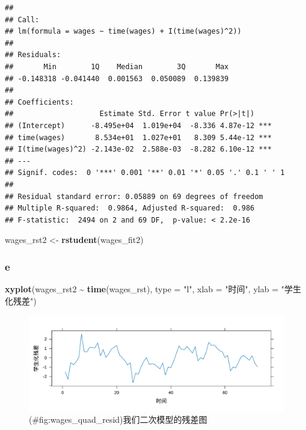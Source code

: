 \documentclass[
]{article}
\newenvironment{Shaded}{\begin{snugshade}}{\end{snugshade}}
\newcommand{\AttributeTok}[1]{\textcolor[rgb]{0.13,0.29,0.53}{#1}}
\newcommand{\FunctionTok}[1]{\textcolor[rgb]{0.13,0.29,0.53}{\textbf{#1}}}
\newcommand{\NormalTok}[1]{#1}
\newcommand{\OtherTok}[1]{\textcolor[rgb]{0.56,0.35,0.01}{#1}}
\newcommand{\SpecialCharTok}[1]{\textcolor[rgb]{0.81,0.36,0.00}{\textbf{#1}}}
\newcommand{\StringTok}[1]{\textcolor[rgb]{0.31,0.60,0.02}{#1}}
\begin{document}
\begin{verbatim}
## 
## Call:
## lm(formula = wages ~ time(wages) + I(time(wages)^2))
## 
## Residuals:
##       Min        1Q    Median        3Q       Max 
## -0.148318 -0.041440  0.001563  0.050089  0.139839 
## 
## Coefficients:
##                    Estimate Std. Error t value Pr(>|t|)    
## (Intercept)      -8.495e+04  1.019e+04  -8.336 4.87e-12 ***
## time(wages)       8.534e+01  1.027e+01   8.309 5.44e-12 ***
## I(time(wages)^2) -2.143e-02  2.588e-03  -8.282 6.10e-12 ***
## ---
## Signif. codes:  0 '***' 0.001 '**' 0.01 '*' 0.05 '.' 0.1 ' ' 1
## 
## Residual standard error: 0.05889 on 69 degrees of freedom
## Multiple R-squared:  0.9864, Adjusted R-squared:  0.986 
## F-statistic:  2494 on 2 and 69 DF,  p-value: < 2.2e-16
\end{verbatim}

\begin{Shaded}
\begin{Highlighting}[]
\NormalTok{wages\_rst2 }\OtherTok{\textless{}{-}} \FunctionTok{rstudent}\NormalTok{(wages\_fit2)}
\end{Highlighting}
\end{Shaded}

\hypertarget{e}{%
\subsubsection*{e}\label{e}}

\begin{Shaded}
\begin{Highlighting}[]
\FunctionTok{xyplot}\NormalTok{(wages\_rst2 }\SpecialCharTok{\textasciitilde{}} \FunctionTok{time}\NormalTok{(wages\_rst), }\AttributeTok{type =} \StringTok{"l"}\NormalTok{,}
       \AttributeTok{xlab =} \StringTok{"时间"}\NormalTok{, }\AttributeTok{ylab =} \StringTok{"学生化残差"}\NormalTok{)}
\end{Highlighting}
\end{Shaded}

\begin{figure}
\centering
\includegraphics{chapter3_files/figure-latex/wages_quad_resid-1.pdf}
\caption{(\#fig:wages\_quad\_resid)我们二次模型的残差图}
\end{figure}
\end{document}
